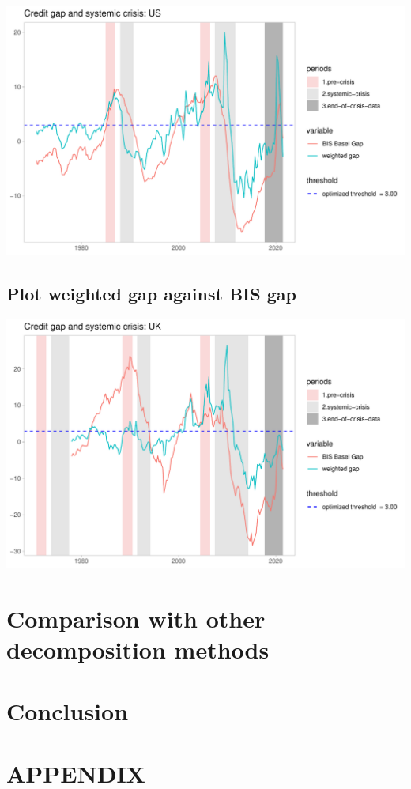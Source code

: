 \documentclass[
  12pt,
]{article}
\begin{document}
\begin{center}\includegraphics[width=1\linewidth]{../Data/Output/Graphs/Weighted_credit_gap_US} \end{center}

\hypertarget{plot-weighted-gap-against-bis-gap-1}{%
\subsection{Plot weighted gap against BIS gap}\label{plot-weighted-gap-against-bis-gap-1}}

\begin{center}\includegraphics[width=1\linewidth]{../Data/Output/Graphs/Weighted_credit_gap_UK} \end{center}

\hypertarget{comparison-with-other-decomposition-methods}{%
\section{Comparison with other decomposition methods}\label{comparison-with-other-decomposition-methods}}

\hypertarget{conclusion}{%
\section{Conclusion}\label{conclusion}}

\hypertarget{appendix}{%
\section*{APPENDIX}\label{appendix}}
\end{document}
